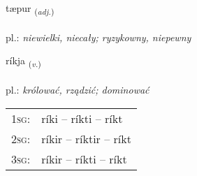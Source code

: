 \documentclass[frontgrid, backgrid]{flacards}\usepackage[]{graphicx}\usepackage[]{xcolor}
\begin{document}
\renewcommand{\flhead}{\vskip5pt \fboxsep=0pt {\small\bfseries\footnotesize Lýsingarorð | Adjective}}
\renewcommand{\fcfoot}{\vskip5pt \fboxsep=0pt \hspace{2pt}{\small\bfseries\footnotesize 2K}}

\renewcommand{\blhead}{\vskip5pt {\small\bfseries\footnotesize Lýsingarorð | Adjective }}
\renewcommand{\bcfoot}{\vskip5pt \hspace{2pt}{\small\bfseries\footnotesize 2K}}


{tæpur \small{\textsubscript{(\textit{adj.})}} \\[1ex] %
\textphonetic{[tʰaiːpʏr]} \\
pl.: \emph{niewielki, niecały; ryzykowny, niepewny} \\  [2ex]
\renewcommand*{\arraystretch}{0.8}
}

\renewcommand{\flhead}{\vskip5pt \fboxsep=0pt {\small\bfseries\footnotesize Sagnorð | Verb}}
\renewcommand{\fcfoot}{\vskip5pt \fboxsep=0pt \hspace{2pt}{\small\bfseries\footnotesize 2K}}

\renewcommand{\blhead}{\vskip5pt {\small\bfseries\footnotesize Sagnorð | Verb }}
\renewcommand{\bcfoot}{\vskip5pt \hspace{2pt}{\small\bfseries\footnotesize 2K}}


{ríkja \small{\textsubscript{(\textit{v.})}} \\[1ex] %
\textphonetic{[riːca]} \\
pl.: \emph{królować, rządzić; dominować} \\  [2ex]
\renewcommand*{\arraystretch}{0.8}
\begin{tabular}{p{1cm}l}
\textsc{1sg}: & ríki -- ríkti -- ríkt \\ 
\textsc{2sg}: & ríkir -- ríktir -- ríkt \\ 
\textsc{3sg}: & ríkir -- ríkti -- ríkt \\ 
\end{tabular}
}
\end{document}
